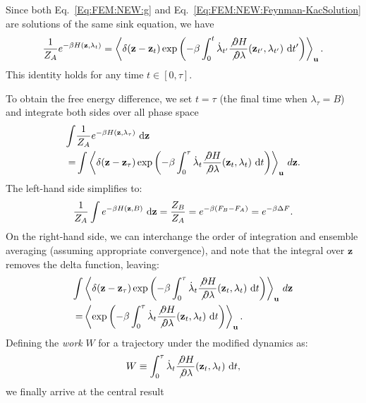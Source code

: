 Since both Eq.~\ref{Eq:FEM:NEW:g} and Eq.~\ref{Eq:FEM:NEW:Feynman-KacSolution} are solutions of the same sink equation, we have
\begin{equation}
	\frac{1}{Z_A} e^{-\beta H(\mathbf{z},\lambda_t)} = \left\langle \delta(\mathbf{z} - \mathbf{z}_t) \exp\left( -\beta \int_0^t \dot{\lambda}_{t'} \frac{\not{\partial} H}{\not{\partial} \lambda}(\mathbf{z}_{t'},\lambda_{t'}) \, \mathop{}\!\mathrm{d} t' \right) \right\rangle_{\mathbf{u}}. 
\end{equation}
This identity holds for any time $t \in [0,\tau]$.

To obtain the free energy difference, we set $t = \tau$ (the final time when $\lambda_\tau = B$) and integrate both sides over all phase space
\begin{align}
	\int &\frac{1}{Z_A} e^{-\beta H(\mathbf{z},\lambda_\tau)} \, \mathop{}\!\mathrm{d} \mathbf{z} \notag\\
	=& \int \left\langle \delta(\mathbf{z} - \mathbf{z}_\tau) \exp\left( -\beta \int_0^\tau \dot{\lambda}_t \frac{\not{\partial} H}{\not{\partial} \lambda}(\mathbf{z}_t,\lambda_t) \, \mathop{}\!\mathrm{d} t \right) \right\rangle_{\mathbf{u}} \, d\mathbf{z}.
\end{align}
The left-hand side simplifies to:
\begin{equation}
	\frac{1}{Z_A} \int e^{-\beta H(\mathbf{z},B)} \, \mathop{}\!\mathrm{d} \mathbf{z} = \frac{Z_B}{Z_A} = e^{-\beta (F_B - F_A)} = e^{-\beta \Delta F}.
\end{equation}
On the right-hand side, we can interchange the order of integration and ensemble averaging (assuming appropriate convergence), and note that the integral over $\mathbf{z}$ removes the delta function, leaving:
\begin{align}
	\int &\left\langle \delta(\mathbf{z} - \mathbf{z}_\tau) \exp\left( -\beta \int_0^\tau \dot{\lambda}_t \frac{\not{\partial} H}{\not{\partial} \lambda}(\mathbf{z}_t,\lambda_t) \, \mathop{}\!\mathrm{d} t \right) \right\rangle_{\mathbf{u}} \, d\mathbf{z} \notag\\
	=& \left\langle \exp\left( -\beta \int_0^\tau \dot{\lambda}_t \frac{\not{\partial} H}{\not{\partial} \lambda}(\mathbf{z}_t,\lambda_t) \, \mathop{}\!\mathrm{d} t \right) \right\rangle_{\mathbf{u}}.
\end{align}
Defining the \textit{work} $W$ for a trajectory under the modified dynamics as:
\begin{equation}
	W \equiv \int_0^\tau \dot{\lambda}_t \frac{\not{\partial} H}{\not{\partial} \lambda}(\mathbf{z}_t,\lambda_t) \, \mathop{}\!\mathrm{d} t,
\end{equation}
we finally arrive at the central result
